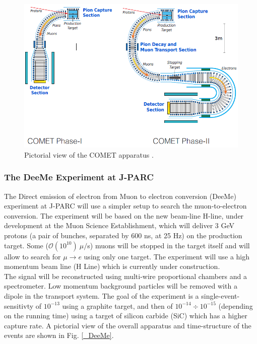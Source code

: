 \documentclass[12pt,a4paper,openright, oneside, titlepage]{book} %
\begin{document}
\begin{figure}[h!]
\centering
\includegraphics[scale=0.8]{COMET}
\caption{Pictorial view of the COMET apparatus \cite{COMET_I}.}
\label{_COMET}
\end{figure}

\subsubsection{The DeeMe Experiment at J-PARC}
The Direct emission of electron from Muon to electron conversion (DeeMe) \cite{DeeMe} experiment at J-PARC 
will use a simpler setup to search the muon-to-electron conversion. 
The experiment will be based on the new beam-line H-line, under development at the Muon Science Establishment, 
which will deliver 3 GeV protons (a pair of bunches, separated by 600 ns, at 25 Hz) on the production target. 
Some ($\mathcal{O}(10^{10})\ \mu/$s) muons will be stopped in the target itself and will allow 
to search for $\mu\rightarrow e$ using only one target. 
The experiment will use a high momentum beam line (H Line) 
which is currently under construction.\\
The signal will be reconstructed using multi-wire proportional chambers and a spectrometer. 
Low momentum background particles will be removed with a dipole in the transport system. 
The goal of the experiment is a single-event-sensitivty of $10^{-13}$ using a graphite target,
 and then of  $10^{-14}\div10^{-15}$ (depending on the running time) using a target of silicon carbide (SiC) 
 which has a higher capture rate. 
A pictorial view of the overall apparatus and time-structure of the events 
are shown in Fig. \ref{_DeeMe}.
\end{document}
